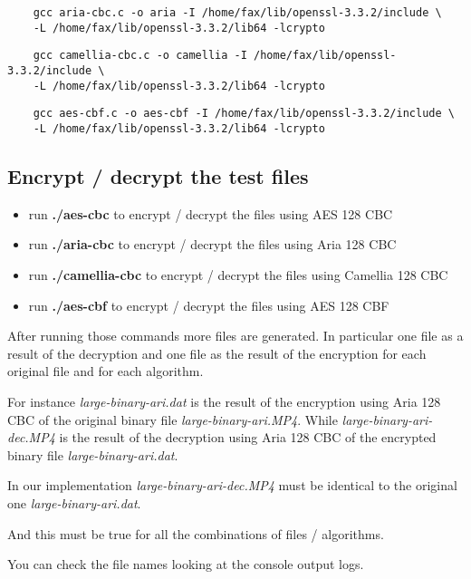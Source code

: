 \documentclass{article}
\begin{document}
\begin{verbatim}
	gcc aria-cbc.c -o aria -I /home/fax/lib/openssl-3.3.2/include \
	-L /home/fax/lib/openssl-3.3.2/lib64 -lcrypto
\end{verbatim}	

\begin{verbatim}
	gcc camellia-cbc.c -o camellia -I /home/fax/lib/openssl-3.3.2/include \
	-L /home/fax/lib/openssl-3.3.2/lib64 -lcrypto
\end{verbatim}	

\begin{verbatim}
	gcc aes-cbf.c -o aes-cbf -I /home/fax/lib/openssl-3.3.2/include \
	-L /home/fax/lib/openssl-3.3.2/lib64 -lcrypto
\end{verbatim}

\subsection{Encrypt / decrypt the test files}		

\begin{itemize}
	\item run \textbf{./aes-cbc}  to encrypt / decrypt the files using  AES 128 CBC
	\item run \textbf{./aria-cbc}  to encrypt / decrypt the files using  Aria 128 CBC
	\item run \textbf{./camellia-cbc}  to encrypt / decrypt the files using  Camellia 128 CBC
	\item run \textbf{./aes-cbf}  to encrypt / decrypt the files using  AES 128 CBF
\end{itemize}

After running those commands more files are generated. In particular one file as a result of the decryption and one file as the result of the encryption for each original file and for each algorithm.

For instance \emph{large-binary-ari.dat} is the result of the encryption using Aria 128 CBC of the original binary file \emph{large-binary-ari.MP4}. While \emph{large-binary-ari-dec.MP4} is the result of the decryption using Aria 128 CBC of the encrypted binary file \emph{large-binary-ari.dat}. 

In our implementation \emph{large-binary-ari-dec.MP4} must be identical to the original one \emph{large-binary-ari.dat}.

And this must be true for all the combinations of files / algorithms.

You can check the file names looking at the console output logs.
\end{document}
